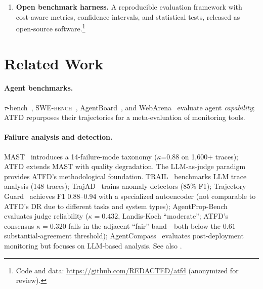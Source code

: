 \documentclass[11pt]{article}
\newcommand{\atfd}{\textsc{ATFD}\xspace}
\newcommand{\taubench}{$\tau$-bench\xspace}
\newcommand{\swebench}{\textsc{SWE-bench}\xspace}
\begin{document}
\begin{enumerate}[leftmargin=2em]
  \item \textbf{Open benchmark harness.} A reproducible evaluation framework
    with cost-aware metrics, confidence intervals, and statistical tests,
    released as open-source software.\footnote{Code and data:
    \url{https://github.com/REDACTED/atfd} (anonymized for review).}
\end{enumerate}

\section{Related Work}
\label{sec:related}

\paragraph{Agent benchmarks.}
\taubench~\citep{yao2025taubench}, \swebench~\citep{jimenez2024swebench},
AgentBoard~\citep{ma2024agentboard}, and WebArena~\citep{zhou2024webarena}
evaluate agent \emph{capability}; \atfd repurposes their trajectories for
a meta-evaluation of monitoring tools.

\paragraph{Failure analysis and detection.}
MAST~\citep{cemri2025mast} introduces a 14-failure-mode taxonomy
($\kappa$=0.88 on 1,600+ traces); \atfd extends MAST with quality
degradation. The LLM-as-judge paradigm~\citep{zheng2023judging,
gu2024llmjudge} provides \atfd's methodological foundation.
TRAIL~\citep{trail2025} benchmarks LLM trace analysis (148 traces);
TrajAD~\citep{trajad2025} trains anomaly detectors (85\% F1);
Trajectory Guard~\citep{trajectoryguard2026} achieves F1 0.88--0.94 with
a specialized autoencoder (not comparable to \atfd's DR due to different
tasks and system types);
AgentProp-Bench~\citep{agentpropbench2026} evaluates judge reliability
($\kappa = 0.432$, Landis-Koch ``moderate''; \atfd's consensus
$\kappa = 0.320$ falls in the adjacent ``fair'' band---both below the
$0.61$ substantial-agreement threshold);
AgentCompass~\citep{agentcompass2025} evaluates post-deployment monitoring
but focuses on LLM-based analysis.
See also \citet{silentfailures2025, agentpex2026, agentrx2026,
nearmiss2026, agentfixer2026, injecagent2024, wasp2025}.
\end{document}
